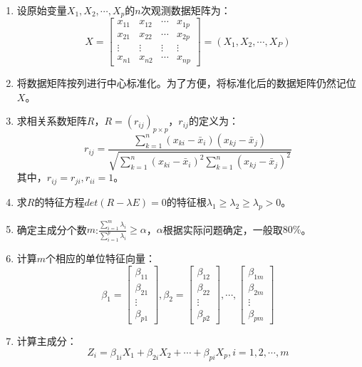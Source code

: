 \documentclass[openany]{progbookcn}
\begin{document}
\begin{enumerate}[itemindent=2em]
\item 设原始变量$X_1,X_2,\cdots,X_p$的$n$次观测数据矩阵为：
\begin{equation}
X = \left[ {\begin{array}{*{20}{c}}
{{x_{11}}}&{{x_{12}}}& \cdots &{{x_{1p}}}\\
{{x_{21}}}&{{x_{22}}}& \cdots &{{x_{2p}}}\\
 \vdots & \vdots & \vdots & \vdots \\
{{x_{n1}}}&{{x_{n2}}}& \cdots &{{x_{np}}}
\end{array}} \right] = \left( {{X_1},{X_2}, \cdots ,{X_P}} \right)
\end{equation}
\item 将数据矩阵按列进行中心标准化。为了方便，将标准化后的数据矩阵仍然记位$X$。
\item 求相关系数矩阵$R$，$R={(r_{ij})}_{p\times p}$，$r_{ij}$的定义为：
\begin{equation}
{r_{ij}} = \frac{{\sum\limits_{k = 1}^n {({x_{ki}} - {{\bar x}_i})({x_{kj}} - {{\bar x}_j})} }}{{\sqrt {\sum\limits_{k = 1}^n {{{({x_{ki}} - {{\bar x}_i})}^2}\sum\limits_{k = 1}^n {{{({x_{kj}} - {{\bar x}_j})}^2}} } } }}
\end{equation}
\indent 其中，$r_{ij}=r_{ji},r_{ii}=1$。
\item 求$R$的特征方程$det(R-\lambda E)=0$的特征根$\lambda_1\ge\lambda_2\ge\lambda_p>0$。
\item 确定主成分个数$m$:$\frac{{\sum\limits_{i = 1}^m {{\lambda _i}} }}{{\sum\limits_{i = 1}^p {{\lambda _i}} }} \ge \alpha $，$\alpha$根据实际问题确定，一般取$80\%$。
\item 计算$m$个相应的单位特征向量：
\begin{equation}
{\beta _1} = \left[ {\begin{array}{*{20}{c}}
{{\beta _{11}}}\\
{{\beta _{21}}}\\
 \vdots \\
{{\beta _{p1}}}
\end{array}} \right],{\beta _2} = \left[ {\begin{array}{*{20}{c}}
{{\beta _{12}}}\\
{{\beta _{22}}}\\
 \vdots \\
{{\beta _{p2}}}
\end{array}} \right], \cdots ,\left[ {\begin{array}{*{20}{c}}
{{\beta _{1m}}}\\
{{\beta _{2m}}}\\
 \vdots \\
{{\beta _{pm}}}
\end{array}} \right]
\end{equation}
\item 计算主成分：
\begin{equation}
{Z_i} = {\beta _{1i}}{X_1} + {\beta _{2i}}{X_2} +  \cdots  + {\beta _{pi}}{X_p},i = 1,2, \cdots ,m
\end{equation}
\end{enumerate}
\end{document}
